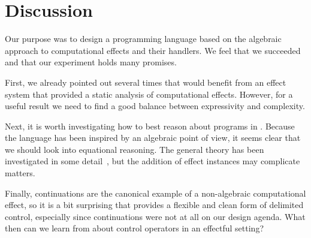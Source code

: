 \section{Discussion}
\label{sec:conclusion}
 
Our purpose was to design a programming language based on the algebraic approach to computational effects and their handlers. We feel that we succeeded and that our experiment holds many promises.

First, we already pointed out several times that \eff would benefit from an effect system that provided a static analysis of computational effects. However, for a useful result we need to find a good balance between expressivity and complexity.

Next, it is worth investigating how to best reason about programs in \eff. Because the language has been inspired by an algebraic point of view, it seems clear that we should look into equational reasoning. The general theory has been investigated in some detail~\cite{plotkin08a-logic, pretnar10:_logic_handl_algeb_effec}, but the addition of effect instances may complicate matters.

Finally, continuations are the canonical example of a non-algebraic computational effect, so
it is a bit surprising that \eff provides a flexible and clean form of delimited control, especially since continuations were not at all on our design agenda. What then can we learn from \eff about control operators in an effectful setting?


